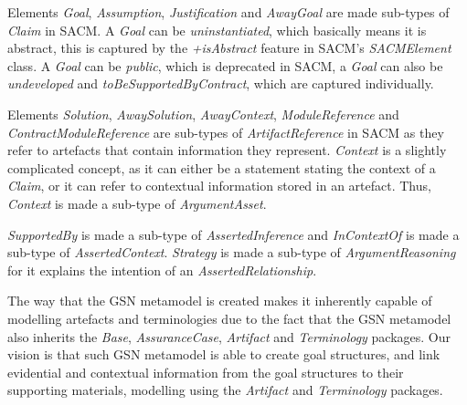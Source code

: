Elements \textit{Goal}, \textit{Assumption}, \textit{Justification} and \textit{AwayGoal} are made sub-types of \textit{Claim} in SACM. 
A \textit{Goal} can be \textit{uninstantiated}, which basically means it is abstract, this is captured by the \textit{+isAbstract} feature in SACM's \textit{SACMElement} class. 
A \textit{Goal} can be \textit{public}, which is deprecated in SACM, a \textit{Goal} can also be \textit{undeveloped} and \textit{toBeSupportedByContract}, which are captured individually. 

Elements \textit{Solution}, \textit{AwaySolution}, \textit{AwayContext}, \textit{ModuleReference} and \textit{ContractModuleReference} are sub-types of \textit{ArtifactReference} in SACM as they refer to artefacts that contain information they represent. 
\textit{Context} is a slightly complicated concept, as it can either be a statement stating the context of a \textit{Claim}, or it can refer to contextual information stored in an artefact. 
Thus, \textit{Context} is made a sub-type of \textit{ArgumentAsset}. 

\textit{SupportedBy} is made a sub-type of \textit{AssertedInference} and \textit{InContextOf} is made a sub-type of \textit{AssertedContext}. 
\textit{Strategy} is made a sub-type of \textit{ArgumentReasoning} for it explains the intention of an \textit{AssertedRelationship}.

The way that the GSN metamodel is created makes it inherently capable of modelling artefacts and terminologies due to the fact that the GSN metamodel also inherits the \textit{Base}, \textit{AssuranceCase}, \textit{Artifact} and \textit{Terminology} packages. 
Our vision is that such GSN metamodel is able to create goal structures, and link evidential and contextual information from the goal structures to their supporting materials, modelling using the \textit{Artifact} and \textit{Terminology} packages. 

